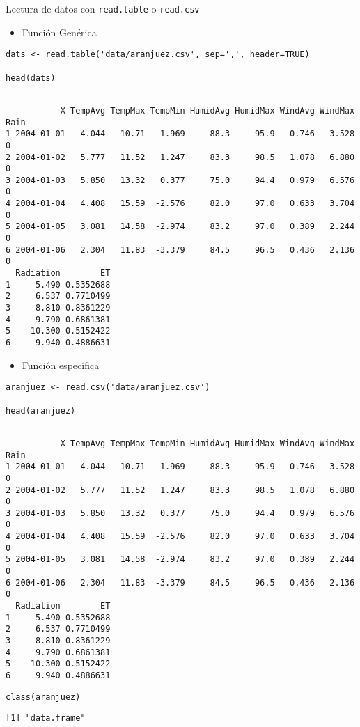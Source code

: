 \documentclass[aspectratio=169, usenames,svgnames,dvipsnames]{beamer}
\begin{document}
\begin{frame}[label={sec:org8cb32cd},fragile]{Lectura de datos con \texttt{read.table} o \texttt{read.csv}}
 \begin{itemize}
\item Función Genérica
\end{itemize}
\lstset{language=r,label= ,caption= ,captionpos=b,numbers=none}
\begin{lstlisting}
dats <- read.table('data/aranjuez.csv', sep=',', header=TRUE)

head(dats)
\end{lstlisting}

\begin{verbatim}

           X TempAvg TempMax TempMin HumidAvg HumidMax WindAvg WindMax Rain
1 2004-01-01   4.044   10.71  -1.969     88.3     95.9   0.746   3.528    0
2 2004-01-02   5.777   11.52   1.247     83.3     98.5   1.078   6.880    0
3 2004-01-03   5.850   13.32   0.377     75.0     94.4   0.979   6.576    0
4 2004-01-04   4.408   15.59  -2.576     82.0     97.0   0.633   3.704    0
5 2004-01-05   3.081   14.58  -2.974     83.2     97.0   0.389   2.244    0
6 2004-01-06   2.304   11.83  -3.379     84.5     96.5   0.436   2.136    0
  Radiation        ET
1     5.490 0.5352688
2     6.537 0.7710499
3     8.810 0.8361229
4     9.790 0.6861381
5    10.300 0.5152422
6     9.940 0.4886631
\end{verbatim}

\begin{itemize}
\item Función específica
\end{itemize}
\lstset{language=r,label= ,caption= ,captionpos=b,numbers=none}
\begin{lstlisting}
aranjuez <- read.csv('data/aranjuez.csv')

head(aranjuez)
\end{lstlisting}

\begin{verbatim}

           X TempAvg TempMax TempMin HumidAvg HumidMax WindAvg WindMax Rain
1 2004-01-01   4.044   10.71  -1.969     88.3     95.9   0.746   3.528    0
2 2004-01-02   5.777   11.52   1.247     83.3     98.5   1.078   6.880    0
3 2004-01-03   5.850   13.32   0.377     75.0     94.4   0.979   6.576    0
4 2004-01-04   4.408   15.59  -2.576     82.0     97.0   0.633   3.704    0
5 2004-01-05   3.081   14.58  -2.974     83.2     97.0   0.389   2.244    0
6 2004-01-06   2.304   11.83  -3.379     84.5     96.5   0.436   2.136    0
  Radiation        ET
1     5.490 0.5352688
2     6.537 0.7710499
3     8.810 0.8361229
4     9.790 0.6861381
5    10.300 0.5152422
6     9.940 0.4886631
\end{verbatim}

\lstset{language=r,label= ,caption= ,captionpos=b,numbers=none}
\begin{lstlisting}
class(aranjuez)
\end{lstlisting}

\begin{verbatim}
[1] "data.frame"
\end{verbatim}
\end{frame}
\end{document}

